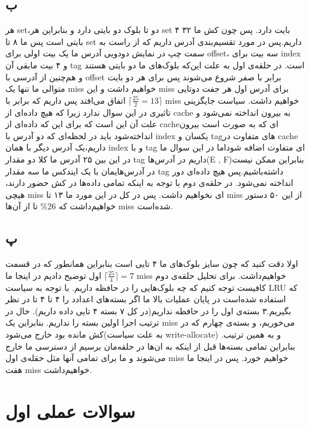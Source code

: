 \documentclass[11pt]{article}
\begin{document}
\subsection{ب}
هر set،دو تا بلوک دو بایتی دارد و بنابراین هر set ۴ بایت دارد. پس چون کش ما ۳۲ بایتی است پس ما ۸ تا set داریم.پس در مورد تقسیم‌بندی آدرس داریم که از راست به سمت چپ در نمایش دودویی آدرس ما یک بیت اولی برای offset، سه بیت برای index و ۴ بیت مابقی آن tag است.
\newline
در حلقه‌ی اول به علت این‌که بلوک‌های ما دو بایتی هستند و هم‌چنین از آدرسی با offset برابر با صفر شروع می‌شوند پس برای هر دو بایت متوالی ما تنها یک miss خواهیم داشت و این miss برای آدرس اول هر جفت دوتایی اتفاق می‌افتد پس داریم که برابر با 
$\lceil \frac{25}{2} = 13\rceil$
miss خواهیم داشت.
سیاست جایگزینی تاثیری در این سوال ندارد زیرا که هیچ داده‌ای از cache به بیرون انداخته نمی‌شود و علت آن این است که برای این که داده‌ای از cache‌ای که به صورت
 است بیرون انداخته‌شود باید در لحظه‌ای که دو آدرس با index یکسان و tag‌های متفاوت در cache داریم،‌یک آدرس دیگر با همان index و با tag ای متفاوت اضافه شوداما در این سوال ما در این بین ۲۵ آدرس ما کلا دو مقدار tag داریم در آدرس‌ها(E , F)بنابراین ممکن نیست در آدرس‌هایمان با یک ایندکس ما سه مقدار tag داشته‌باشیم.پس هیچ داده‌ای دور انداخته نمی‌شود.
 \newline
 در حلقه‌ی دوم با توجه به اینکه تمامی داده‌ها در کش حضور دارند، هیچی miss ای نخواهیم داشت.
 \newline
 پس در کل در این مورد ما ۱۳ تا miss از این ۵۰ دستور خواهیم‌داشت که 26\% تا از آن‌‌ها miss شده‌است. 
\subsection{پ}
اولا دقت کنید که چون سایز بلوک‌های ما ۴ تایی است بنابراین همانطور که در قسمت اول توضیح دادیم در اینجا ما 
$\lceil \frac{25}{4}\rceil = 7$
miss 
خواهیم‌داشت.
\newline
برای تحلیل حلقه‌ی دوم کافیست توجه کنیم که چه بلوک‌هایی را در حافظه داریم. با توجه به سیاست LRU که استفاده شده‌است در پایان عملیات بالا ما اگر بسته‌های اعدادد را ۴ تا ۴ تا در نظر بگیریم.۳ بسته‌ی اول را در حافظه نداریم(در کل ۷ بسته ۴ تایی داده داریم). حال در ترتیب اجرا اولین بسته را نداریم. بنابراین یک miss می‌خوریم، و بسته‌ی چهارم که در کش مانده بود خارج می‌شود(به علت سیاست write-allocate) و به همین ترتیب. بنابراین تمامی بسته‌ها قبل از اینکه به ان‌ها در حلقه‌مان برسیم از دسترسی ما خارج می‌شوند و ما برای تمامی آنها مثل  حقله‌ی اول miss خواهیم خورد. پس در اینجا ما هفت miss خواهیم‌داشت.
\section{سوالات عملی اول}
\end{document}
